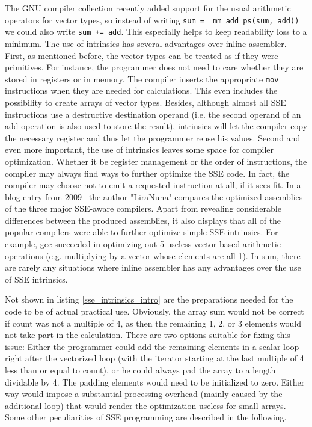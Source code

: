 The GNU compiler collection recently added support for the usual arithmetic operators for vector types, so instead of writing \texttt{sum = \_mm\_add\_ps(sum, add))} we could also write \texttt{sum += add}. This especially helps to keep readability loss to a minimum. The use of intrinsics has several advantages over inline assembler. First, as mentioned before, the vector types can be treated as if they were primitives. For instance, the programmer does not need to care whether they are stored in registers or in memory. The compiler inserts the appropriate \texttt{mov} instructions when they are needed for calculations. This even includes the possibility to create arrays of vector types. Besides, although almost all SSE instructions use a destructive destination operand (i.e. the second operand of an add operation is also used to store the result), intrinsics will let the compiler copy the necessary register and thus let the programmer reuse his values. Second and even more important, the use of intrinsics leaves some space for compiler optimization. Whether it be register management or the order of instructions, the compiler may always find ways to further optimize the SSE code. In fact, the compiler may choose not to emit a requested instruction at all, if it sees fit. In a blog entry from 2009~\cite{liranuna2009} the author "LiraNuna" compares the optimized assemblies of the three major SSE-aware compilers. Apart from revealing considerable differences between the produced assemblies, it also displays that all of the popular compilers were able to further optimize simple SSE intrinsics. For example, gcc succeeded in optimizing out 5 useless vector-based arithmetic operations (e.g. multiplying by a vector whose elements are all 1). In sum, there are rarely any situations where inline assembler has any advantages over the use of SSE intrinsics.

Not shown in listing \ref{sse_intrinsics_intro} are the preparations needed for the code to be of actual practical use. Obviously, the array sum would not be correct if count was not a multiple of 4, as then the remaining 1, 2, or 3 elements would not take part in the calculation. There are two options suitable for fixing this issue: Either the programmer could add the remaining elements in a scalar loop right after the vectorized loop (with the iterator starting at the last multiple of 4 less than or equal to count), or he could always pad the array to a length dividable by 4. The padding elements would need to be initialized to zero. Either way would impose a substantial processing overhead (mainly caused by the additional loop) that would render the optimization useless for small arrays. Some other peculiarities of SSE programming are described in the following.

